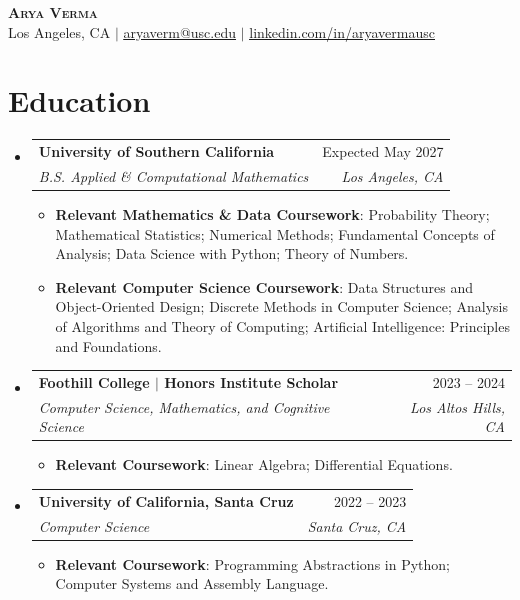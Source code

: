 \documentclass[letterpaper,10pt]{article}
\newcommand{\resumeItem}[1]{
  \item\small{#1 \vspace{-2.5pt}}
}
\newcommand{\resumeSubheading}[4]{
  \vspace{-2pt}\item
    \begin{tabularx}{0.97\textwidth}[t]{Xr}
      \textbf{#1} & #2 \\
      \textit{\small#3} & \textit{\small #4} \\
    \end{tabularx}\vspace{-7pt}
}
\newcommand{\resumeSubHeadingListStart}{\begin{itemize}[leftmargin=0.15in, label={}]}
\newcommand{\resumeSubHeadingListEnd}{\end{itemize}}
\newcommand{\resumeItemListStart}{\begin{itemize}[leftmargin=0.20in, itemsep=0pt, topsep=1.5pt]}
\newcommand{\resumeItemListEnd}{\end{itemize}\vspace{-5.5pt}}
\begin{document}
\begin{center}
    \textbf{\Huge \scshape Arya Verma} \\ \vspace{0pt}
    \small Los Angeles, CA $|$
    \href{mailto:aryaverm@usc.edu}{\underline{aryaverm@usc.edu}} $|$
    \href{https://linkedin.com/in/aryavermausc}{\underline{linkedin.com/in/aryavermausc}}
\end{center}\vspace{-13pt}

\section{Education}
  \resumeSubHeadingListStart
    \resumeSubheading
      {University of Southern California}{Expected May 2027}
      {B.S. Applied \& Computational Mathematics}{Los Angeles, CA}
      \resumeItemListStart
        \resumeItem{\textbf{Relevant Mathematics \& Data Coursework}: Probability Theory; Mathematical Statistics; Numerical Methods; Fundamental Concepts of Analysis; Data Science with Python; Theory of Numbers.}
        \resumeItem{\textbf{Relevant Computer Science Coursework}: Data Structures and Object-Oriented Design; Discrete Methods in Computer Science; Analysis of Algorithms and Theory of Computing; Artificial Intelligence: Principles and Foundations.}
      \resumeItemListEnd
    \resumeSubheading
      {Foothill College {\normalfont\small $|$ Honors Institute Scholar}}{2023 -- 2024}
      {Computer Science, Mathematics, and Cognitive Science}{Los Altos Hills, CA}
      \resumeItemListStart
        \resumeItem{\textbf{Relevant Coursework}: Linear Algebra; Differential Equations.}
      \resumeItemListEnd
    \resumeSubheading
      {University of California, Santa Cruz}{2022 -- 2023}
      {Computer Science}{Santa Cruz, CA}
      \resumeItemListStart
        \resumeItem{\textbf{Relevant Coursework}: Programming Abstractions in Python; Computer Systems and Assembly Language.}
      \resumeItemListEnd
  \resumeSubHeadingListEnd

\end{document}
